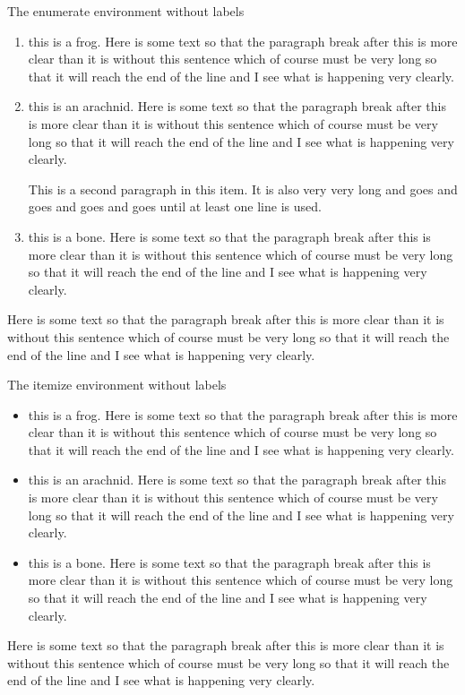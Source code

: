 \documentclass{article}
\begin{document}
 The
enumerate environment without labels
\begin{enumerate}
\item this is a frog. Here is some text so that the paragraph break after this
is more clear than it is without this sentence which of
course must be very long so that it will reach the end of
the line and I see what is happening very clearly.
\item this is an arachnid. Here is some text so that the paragraph break after this
is more clear than it is without this sentence which of
course must be very long so that it will reach the end of
the line and I see what is happening very clearly.

This is a second paragraph in this item.  It is also
very very long and goes and goes and goes and goes until
at least one line is used.

\item this is a bone. Here is some text so that the paragraph break after this
is more clear than it is without this sentence which of
course must be very long so that it will reach the end of
the line and I see what is happening very clearly.
\end{enumerate}
Here is some text so that the paragraph break after this
is more clear than it is without this sentence which of
course must be very long so that it will reach the end of
the line and I see what is happening very clearly.

The itemize environment without labels
\begin{itemize}
\item this is a frog. Here is some text so that the paragraph break after this
is more clear than it is without this sentence which of
course must be very long so that it will reach the end of
the line and I see what is happening very clearly.
\item this is an arachnid. Here is some text so that the paragraph break after this
is more clear than it is without this sentence which of
course must be very long so that it will reach the end of
the line and I see what is happening very clearly.
\item this is a bone. Here is some text so that the paragraph break after this
is more clear than it is without this sentence which of
course must be very long so that it will reach the end of
the line and I see what is happening very clearly.
\end{itemize}
Here is some text so that the paragraph break after this
is more clear than it is without this sentence which of
course must be very long so that it will reach the end of
the line and I see what is happening very clearly.
\end{document}
